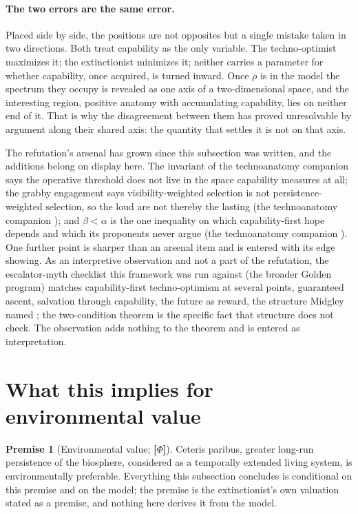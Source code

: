 \documentclass[11pt]{article}
\theoremstyle{plain}
\theoremstyle{definition}
\newtheorem{premise}{Premise}
\theoremstyle{remark}
\begin{document}
\paragraph{The two errors are the same error.}\label{hr:rem:sameerror}
Placed side by side, the positions are not opposites but a single
mistake taken in two directions. Both treat capability as the only
variable. The techno-optimist maximizes it; the extinctionist minimizes
it; neither carries a parameter for whether capability, once acquired,
is turned inward. Once $\rho$ is in the model the spectrum they occupy
is revealed as one axis of a two-dimensional space, and the interesting
region, positive anatomy with accumulating capability, lies on
neither end of it. That is why the disagreement between them has proved
unresolvable by argument along their shared axis: the quantity that
settles it is not on that axis.


The refutation's arsenal has grown since this subsection was written,
and the additions belong on display here. The invariant of
the technoanatomy companion \cite{TechnoC} says the operative threshold does not
live in the space capability measures at all; the grabby engagement
says visibility-weighted selection is not persistence-weighted
selection, so the loud are not thereby the lasting
(the technoanatomy companion \cite{TechnoC}); and $\beta<\alpha$ is the one
inequality on which capability-first hope depends and which its
proponents never argue (the technoanatomy companion \cite{TechnoC}). One further
point is sharper than an arsenal item and is entered with its edge
showing. As an interpretive observation and not a part of the refutation, the
escalator-myth checklist this framework was run against
(the broader Golden program) matches capability-first techno-optimism
at several points, guaranteed ascent, salvation through capability,
the future as reward, the structure Midgley named \cite{Midgley85};
the two-condition theorem is the specific fact that structure does not
check. The observation adds nothing to the theorem and is entered as
interpretation.


\section{What this implies for environmental value}\label{sec:environment}

\label{hr:sub:environment}

\begin{premise}[Environmental value; \textbf{[$\Phi$]}]\label{hr:prem:env}
Ceteris paribus, greater long-run persistence of the biosphere,
considered as a temporally extended living system, is environmentally
preferable. Everything this subsection concludes is conditional on this
premise and on the model; the premise is the extinctionist's own
valuation stated as a premise, and nothing here derives it from the
model.
\end{premise}
\end{document}
